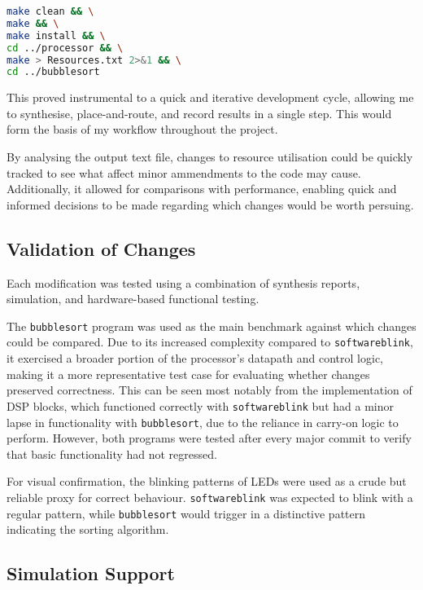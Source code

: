 \documentclass[a4paper,10pt]{article}
\begin{document}
\begin{lstlisting}[language=bash,
    caption={Workflow used to synthesise and record results},
    label={prog:Workflow}]
make clean && \
make && \
make install && \
cd ../processor && \
make > Resources.txt 2>&1 && \
cd ../bubblesort
\end{lstlisting}

This proved instrumental to a quick and iterative development cycle, 
allowing me to synthesise, place-and-route, and record results in a single step.
This would form the basis of my workflow throughout the project.

By analysing the output text file, changes to resource utilisation
could be quickly tracked to see what affect minor ammendments to the code may cause.
Additionally, it allowed for comparisons with performance,
enabling quick and informed decisions to be made regarding which changes 
would be worth persuing.

\subsection*{Validation of Changes}

Each modification was tested using a combination of synthesis reports, 
simulation, and hardware-based functional testing. 

The \texttt{bubblesort} program was used as the main benchmark 
against which changes could be compared. 
Due to its increased complexity compared to \texttt{softwareblink}, 
it exercised a broader portion of the processor's datapath and control logic, 
making it a more representative test case for evaluating 
whether changes preserved correctness. 
This can be seen most notably from the implementation of DSP blocks,
which functioned correctly with \texttt{softwareblink} 
but had a minor lapse in functionality with \texttt{bubblesort},
due to the reliance in carry-on logic to perform.
However, both programs were tested after every major commit to verify 
that basic functionality had not regressed.

For visual confirmation, the blinking patterns of LEDs were used as a crude 
but reliable proxy for correct behaviour. 
\texttt{softwareblink} was expected to blink with a regular pattern, 
while \texttt{bubblesort} would trigger in a distinctive pattern 
indicating the sorting algorithm.

\subsection*{Simulation Support}
\end{document}
